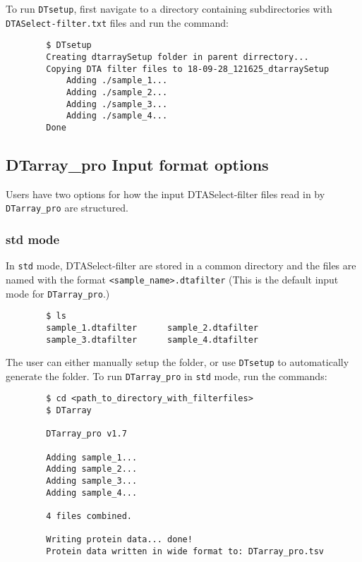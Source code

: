 \documentclass[12pt]{article}
\begin{document}
	\bigskip
	\noindent
	To run \texttt{DTsetup}, first navigate to a directory containing subdirectories with \texttt{DTASelect-filter.txt} files and run the command:
	
	\begin{lstlisting}
		$ DTsetup
		Creating dtarraySetup folder in parent dirrectory...
		Copying DTA filter files to 18-09-28_121625_dtarraySetup
			Adding ./sample_1...
			Adding ./sample_2...
			Adding ./sample_3...
			Adding ./sample_4...
		Done
	\end{lstlisting}
	
	\subsection{DTarray\_pro Input format options}
	
	Users have two options for how the input DTASelect-filter files read in by \texttt{DTarray\_pro} are structured.  
	
	\subsubsection{std mode} 
		
	In \texttt{std} mode, DTASelect-filter are stored in a common directory and the files are named with the format \texttt{<sample\_name>.dtafilter} (This is the default input mode for \texttt{DTarray\_pro}.)
	
	\begin{lstlisting}
		$ ls
		sample_1.dtafilter		sample_2.dtafilter
		sample_3.dtafilter		sample_4.dtafilter
	\end{lstlisting}
	
	\noindent
	The user can either manually setup the folder, or use \texttt{DTsetup} to automatically generate the folder.  To run \texttt{DTarray\_pro} in \texttt{std} mode, run the commands:
	
	\begin{lstlisting}
		$ cd <path_to_directory_with_filterfiles>
		$ DTarray
		
		DTarray_pro v1.7
		
		Adding sample_1...
		Adding sample_2...
		Adding sample_3...
		Adding sample_4...
		
		4 files combined.
		
		Writing protein data... done!
		Protein data written in wide format to: DTarray_pro.tsv
		
	\end{lstlisting}
	
\end{document}
